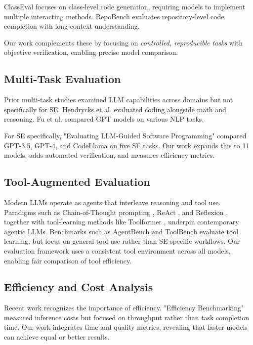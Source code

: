 ClassEval \cite{classexplore} focuses on class-level code generation, requiring models to implement multiple interacting methods. RepoBench \cite{repobench} evaluates repository-level code completion with long-context understanding.

Our work complements these by focusing on \textit{controlled, reproducible tasks} with objective verification, enabling precise model comparison.

\subsection{Multi-Task Evaluation}

Prior multi-task studies examined LLM capabilities across domains but not specifically for SE. Hendrycks et al. \cite{hendrycks2021measuring} evaluated coding alongside math and reasoning. Fu et al. \cite{fu2023gptscore} compared GPT models on various NLP tasks.

For SE specifically, "Evaluating LLM-Guided Software Programming" \cite{evaluating2024llm} compared GPT-3.5, GPT-4, and CodeLlama on five SE tasks. Our work expands this to 11 models, adds automated verification, and measures efficiency metrics.

\subsection{Tool-Augmented Evaluation}

Modern LLMs operate as agents that interleave reasoning and tool use. Paradigms such as Chain-of-Thought prompting \cite{cot}, ReAct \cite{react}, and Reflexion \cite{reflexion}, together with tool-learning methods like Toolformer \cite{toolformer}, underpin contemporary agentic LLMs. Benchmarks such as AgentBench \cite{agentbench} and ToolBench \cite{qinetal2023toolllm} evaluate tool learning, but focus on general tool use rather than SE-specific workflows. Our evaluation framework uses a consistent tool environment across all models, enabling fair comparison of tool efficiency.

\subsection{Efficiency and Cost Analysis}

Recent work recognizes the importance of efficiency. "Efficiency Benchmarking" \cite{efficiency2024} measured inference costs but focused on throughput rather than task completion time. Our work integrates time and quality metrics, revealing that faster models can achieve equal or better results.

